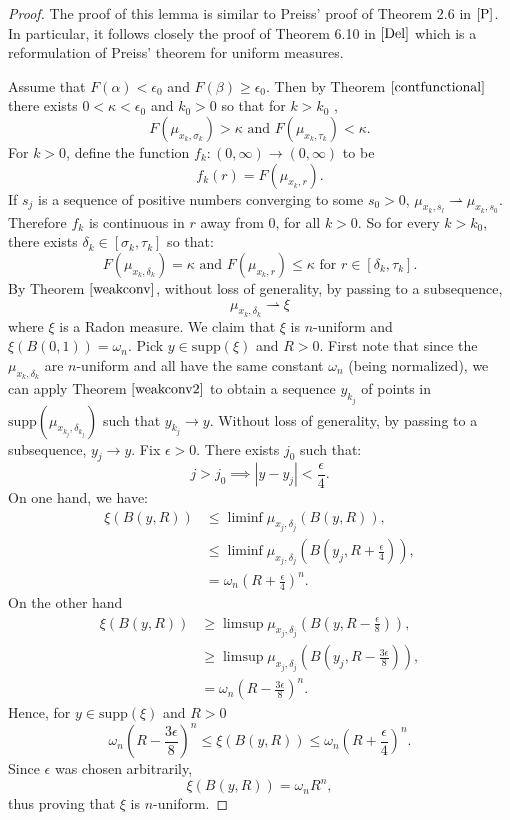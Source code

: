 \documentclass[11pt]{article}
\theoremstyle{definition}
\theoremstyle{remark}
\numberwithin{equation}{section}
\begin{document}
\begin{proof}
The proof of this lemma is similar to  Preiss' proof of Theorem 2.6  in $\cite{P}$. In particular, it follows closely the proof of Theorem 6.10 in $\cite{Del}$ which is a reformulation of Preiss' theorem for uniform measures.

Assume that  $F(\alpha)<\epsilon_{0}$ and $F(\beta) \geq \epsilon_{0}$.
Then by Theorem $\ref{contfunctional}$ there exists $0<\kappa<\epsilon_{0}$ and $k_0>0$ so that for $k>k_0$ , $$ F(\mu_{x_k , \sigma_k }) > \kappa \mbox{ and } F(\mu_{x_k , \tau_k }) < \kappa.$$
For $k>0$, define the function $f_k: (0,\infty) \rightarrow (0,\infty)$ to be 
$$f_k(r)=F(\mu_{x_k , r}).$$
If $s_j$ is a sequence of positive numbers converging to some $s_0>0$, $\mu_{x_k, s_l} \rightharpoonup \mu_{x_k, s_0}$. Therefore $f_k$
is continuous in $r$ away from $0$, for all $k>0$. 
So for every $k>k_0$, there exists $\delta_{k} \in [\sigma_{k} , \tau_{k} ]$ so that:
\begin{equation} \label{deltak}
F(\mu_{x_k , \delta_{k}}) = \kappa \mbox{ and } F(\mu_{x_k , r}) \leq \kappa \mbox{ for } r \in [\delta_k, \tau_k].
\end{equation}
By Theorem $\ref{weakconv}$, without loss of generality, by passing to a subsequence, $$\mu_{x_k , \delta_{k}} \rightharpoonup \xi $$
where $\xi$ is a Radon measure. 
We claim that $\xi$ is $n$-uniform and $\xi(B(0,1))=\omega_{n}$. Pick $y \in \mbox{supp}(\xi)$ and $R>0$.
First note that since the $\mu_{x_k , \delta_{k}}$ are $n$-uniform and all have the same constant $\omega_n$ (being normalized), we can apply Theorem $\ref{weakconv2}$ to obtain a sequence $y_{k_j}$ of points in $\mbox{supp}(\mu_{x_{k_j} , \delta_{k_j}})$ such that $y_{k_j} \to y$. Without loss of generality, by passing to a subsequence, $y_j \to y$.
Fix $\epsilon>0$. There exists $j_0$ such that: 
$$ j>j_0 \implies |y-y_j| < \frac{\epsilon}{4}.$$
On one hand, we have:
\begin{align*}
\xi(B(y,R)) & \leq \liminf \mu_{x_j , \delta_{j}}(B(y,R)), \\ & \leq \liminf \mu_{x_j , \delta_{j}}(B(y_j,R+\frac{\epsilon}{4})), \\ &=\omega_{n} \left(R+\frac{\epsilon}{4}\right)^{n}.
\end{align*}
On the other hand
\begin{align*}
\xi(B(y,R)) & \geq \limsup \mu_{x_j , \delta_{j}}(B(y,R-\frac{\epsilon}{8})), \\ & \geq \limsup \mu_{x_j , \delta_{j}}(B(y_j,R-\frac{3\epsilon}{8})), \\ &=\omega_{n} \left(R-\frac{3\epsilon}{8}\right)^{n}.
\end{align*}
Hence, for $y \in \mbox{supp}(\xi)$ and $R>0$
$$ \omega_{n} \left(R-\frac{3\epsilon}{8}\right)^{n} \leq \xi(B(y,R)) \leq \omega_{n} \left(R+\frac{\epsilon}{4}\right)^{n}.$$
Since $\epsilon$ was chosen arbitrarily, $$\xi(B(y,R))=\omega_{n} R^{n},$$ thus proving that $\xi$ is $n$-uniform.


\end{proof}
\end{document}
